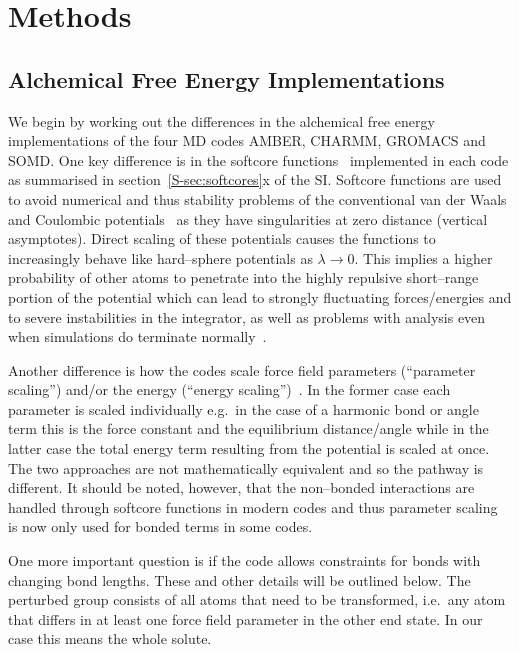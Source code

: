 \documentclass[journal=jctcce,manuscript=article]{achemso}
\begin{document}
\section{Methods}
\label{sec:methods}

\subsection{Alchemical Free Energy Implementations}
\label{sec:afe_impl}

We begin by working out the differences in the alchemical free energy
implementations of the four MD codes AMBER, CHARMM, GROMACS and
SOMD.  One key difference is in the softcore
functions~\cite{beutler_avoiding_1994, zacharias_separationshifted_1994} 
implemented in each code as summarised in section~\ref{S-sec:softcores}x of the 
SI.  Softcore functions are used to avoid numerical and thus
stability problems of the conventional van der Waals and Coulombic
potentials~\cite{steinbrecher_nonlinear_2007} as they have
singularities at zero distance (vertical asymptotes).  Direct scaling
of these potentials causes the functions to increasingly behave like
hard--sphere potentials as $\lambda\rightarrow 0$.  This implies a
higher probability of other atoms to penetrate into the highly
repulsive short--range portion of the potential which can lead to
strongly fluctuating forces/energies and to severe instabilities in
the integrator, as well as problems with analysis even when simulations do 
terminate 
normally~\cite{beutler_avoiding_1994, zacharias_separationshifted_1994, 
steinbrecher_nonlinear_2007}.

Another difference is how the codes scale force field parameters (``parameter 
scaling'') and/or the energy (``energy 
scaling'')~\cite{doi:10.1021/jp981628n}.  In the former case each parameter is 
scaled individually e.g.\ in the case of a harmonic bond or angle term
this is the force constant and the equilibrium distance/angle while in the 
latter case the total energy term resulting from the potential is scaled at 
once.  The two approaches are not mathematically equivalent and so the pathway 
is different.  It should be noted, however, that the non--bonded interactions 
are handled through softcore functions in modern codes and thus parameter 
scaling~\cite{doi:10.1021/j100056a020, JCROSS1986198} is now only used for 
bonded terms in some codes.

One more important question is if the code allows constraints for bonds with 
changing bond lengths.  These and other details will be outlined below.  The 
perturbed group consists of all atoms that need to be transformed, i.e.\ any 
atom that differs in at least one force field parameter in the other end
state.  In our case this means the whole solute.%
\end{document}
